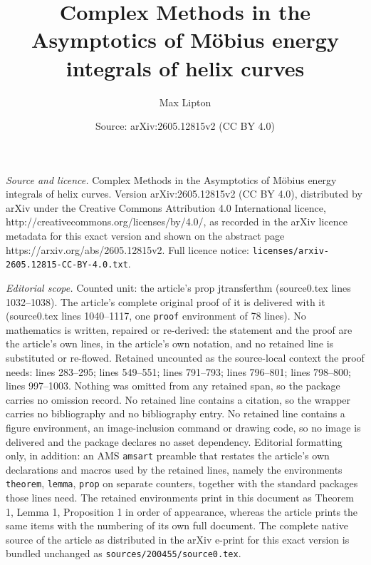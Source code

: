 \documentclass[10pt,a4paper]{amsart}
\title{Complex Methods in the Asymptotics of M\"obius energy integrals of helix curves}
\author{Max Lipton}
\date{Source: arXiv:2605.12815v2 (CC BY 4.0)}
\begin{document}
\maketitle

\noindent\emph{Source and licence.} Complex Methods in the Asymptotics of M\"obius energy integrals of helix curves. Version arXiv:2605.12815v2 (CC BY 4.0), distributed by arXiv under the Creative Commons Attribution 4.0 International licence, http://creativecommons.org/licenses/by/4.0/, as recorded in the arXiv licence metadata for this exact version and shown on the abstract page https://arxiv.org/abs/2605.12815v2. Full licence notice: \texttt{licenses/arxiv-2605.12815-CC-BY-4.0.txt}.\par\smallskip

\noindent\textit{Editorial scope.} Counted unit: the article's prop jtransferthm (source0.tex lines 1032--1038). The article's complete original proof of it is delivered with it (source0.tex lines 1040--1117, one \texttt{proof} environment of 78 lines). No mathematics is written, repaired or re-derived: the statement and the proof are the article's own lines, in the article's own notation, and no retained line is substituted or re-flowed.  Retained uncounted as the source-local context the proof needs: lines 283--295; lines 549--551; lines 791--793; lines 796--801; lines 798--800; lines 997--1003.  Nothing was omitted from any retained span, so the package carries no omission record.  No retained line contains a citation, so the wrapper carries no bibliography and no bibliography entry.  No retained line contains a figure environment, an image-inclusion command or drawing code, so no image is delivered and the package declares no asset dependency.  Editorial formatting only, in addition: an AMS \texttt{amsart} preamble that restates the article's own declarations and macros used by the retained lines, namely the environments \texttt{theorem}, \texttt{lemma}, \texttt{prop} on separate counters, together with the standard packages those lines need.  The retained environments print in this document as Theorem 1, Lemma 1, Proposition 1 in order of appearance, whereas the article prints the same items with the numbering of its own full document.  The complete native source of the article as distributed in the arXiv e-print for this exact version is bundled unchanged as \texttt{sources/200455/source0.tex}.
\end{document}
